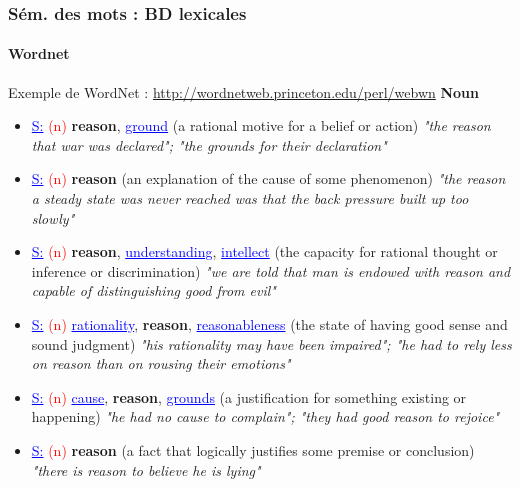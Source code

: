 \documentclass[xcolor=table]{beamer}
\begin{document}
\begin{frame}
\frametitle{Sém. des mots : BD lexicales}
\framesubtitle{Wordnet}

\vspace{-6pt}
\begin{exampleblock}{Exemple de WordNet : \small\url{http://wordnetweb.princeton.edu/perl/webwn}}
	\fontsize{6}{6}\selectfont
	{\small\bfseries Noun}
	\begin{itemize}
		\item \textcolor{blue}{\underline{S:}} \textcolor{red}{(n)} \textbf{reason}, \textcolor{blue}{\underline{ground}} (a rational motive for a belief or action) \textit{"the reason that war was declared"; "the grounds for their declaration"}
		\item \textcolor{blue}{\underline{S:}} \textcolor{red}{(n)} \textbf{reason} (an explanation of the cause of some phenomenon) \textit{"the reason a steady state was never reached was that the back pressure built up too slowly"}
		\item \textcolor{blue}{\underline{S:}} \textcolor{red}{(n)} \textbf{reason}, \textcolor{blue}{\underline{understanding}}, \textcolor{blue}{\underline{intellect}} (the capacity for rational thought or inference or discrimination) \textit{"we are told that man is endowed with reason and capable of distinguishing good from evil"}
		\item \textcolor{blue}{\underline{S:}} \textcolor{red}{(n)} \textcolor{blue}{\underline{rationality}}, \textbf{reason}, \textcolor{blue}{\underline{reasonableness}} (the state of having good sense and sound judgment) \textit{"his rationality may have been impaired"; "he had to rely less on reason than on rousing their emotions"}
		\item \textcolor{blue}{\underline{S:}} \textcolor{red}{(n)} \textcolor{blue}{\underline{cause}}, \textbf{reason}, \textcolor{blue}{\underline{grounds}} (a justification for something existing or happening) \textit{"he had no cause to complain"; "they had good reason to rejoice"}
		\item \textcolor{blue}{\underline{S:}} \textcolor{red}{(n)} \textbf{reason} (a fact that logically justifies some premise or conclusion) \textit{"there is reason to believe he is lying"}
	\end{itemize}
	

\end{exampleblock}
\end{frame}
\end{document}
